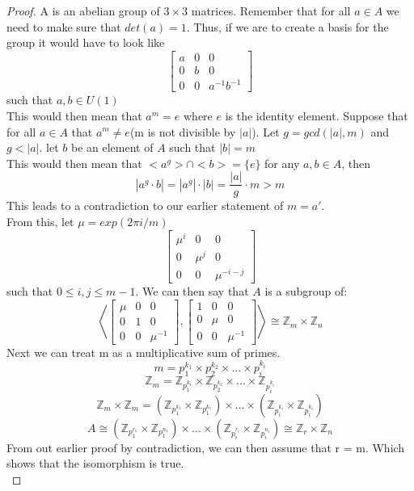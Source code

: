 \documentclass[12pt]{article}
\newcommand{\Z}{\mathbb{Z}}
\begin{document}
\begin{proof}
A is an abelian group of $3 \times 3$ matrices. Remember that for all $a \in A$ we need to make sure that $det(a) = 1$. Thus, if we are to create a basis for the group it would have to look like
\[
	\left[ \begin{matrix}
	a & 0 & 0\\
	0 & b & 0\\
	0 & 0 & a^{-1}b^{-1}
	\end{matrix} \right]
\]
such that $a,b \in U(1)$\\
This would then mean that $a^m = e$ where $e$ is the identity element. Suppose that for all $a \in A$ that $a^m \neq e$(m is not divisible by $|a|$). Let $g = gcd(|a|,m)$ and $g < |a|$. let $b$ be an element of $A$ such that $|b| = m$\\
This would then mean that $<a^g> \cap <b> = \{e\}$ for any $a,b \in A$, then
\[ |a^g \cdot b| = |a^g| \cdot |b| = \frac{|a|}{g} \cdot m > m\]
This leads to a contradiction to our earlier statement of $m = a'$.\\
From this, let $\mu = exp(2\pi i/m)$
\[
	\left[\begin{matrix}
	\mu^i & 0 & 0\\
	0 & \mu^j & 0\\
	0 & 0 & \mu^{-i-j}
	\end{matrix}\right]
\]
such that $0 \leq i,j \leq m-1$. We can then say that $A$ is a subgroup of:
\[
	\left\langle 
	\left[\begin{matrix}
	\mu & 0 & 0\\
	0 & 1 & 0\\
	0 & 0 & \mu^{-1}
	\end{matrix}\right],
	\left[\begin{matrix}
	1 & 0 & 0\\
	0 & \mu & 0\\
	0 & 0 & \mu^{-1}
	\end{matrix}\right] 	
	\right\rangle \cong \Z_m \times \Z_n
\]
Next we can treat m as a multiplicative sum of primes.
\[ m = p_1^{k_1} \times p_2^{k_2} \times ... \times p_i^{k_i} \]
\[ \Z_m = \Z_{p_1^{k_1}} \times \Z_{p_2^{k_2}} \times ... \times \Z_{p_i^{k_i}} \]
\[ \Z_m \times \Z_m = (\Z_{p_1^{k_1}} \times \Z_{p_1^{k_1}}) \times ... \times (\Z_{p_i^{k_i}} \times \Z_{p_i^{k_i}}) \]
\[ A \cong (\Z_{p_1^{r_1}} \times \Z_{p_1^{n_1}}) \times ... \times (\Z_{p_i^{r_i}} \times \Z_{p_i^{n_i}}) \cong \Z_r \times \Z_n \]
From out earlier proof by contradiction, we can then assume that r = m. Which shows that the isomorphism is true.\\
\end{proof}
\end{document}
